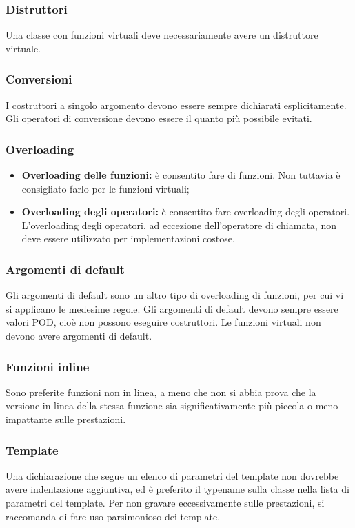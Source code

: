 \documentclass[../NomeDocumento.tex]{subfiles}
\begin{document}
	\subsubsection*{Distruttori}
	Una classe con funzioni virtuali deve necessariamente avere un distruttore virtuale.
		
	\subsubsection*{Conversioni} 
	I costruttori a singolo argomento devono essere sempre dichiarati esplicitamente.	Gli operatori di conversione devono essere il quanto più possibile evitati.
	
	\subsubsection*{Overloading}
	\begin{itemize}
		\item \textbf{Overloading delle funzioni:} è consentito fare  di funzioni. Non tuttavia è consigliato farlo per le funzioni virtuali;
		
		\item \textbf{Overloading degli operatori:} è consentito fare overloading degli operatori. L'overloading degli operatori, ad eccezione dell'operatore di chiamata, non deve essere utilizzato per implementazioni costose.
	\end{itemize}

	\subsubsection*{Argomenti di default} 
	Gli argomenti di default sono un altro tipo di overloading di funzioni, per cui vi si applicano le medesime regole. Gli argomenti di default devono sempre essere valori POD, cioè non possono eseguire costruttori. Le funzioni virtuali non devono avere argomenti di default.
		
	\subsubsection*{Funzioni inline}
	 Sono preferite funzioni non in linea, a meno che non si abbia prova che la versione in linea della stessa funzione sia significativamente più piccola o meno impattante sulle prestazioni.
	
	\subsubsection*{Template} 
	Una dichiarazione che segue un elenco di parametri del template non dovrebbe avere indentazione aggiuntiva, ed è preferito il typename sulla classe nella lista di parametri del template. Per non gravare eccessivamente sulle prestazioni, si raccomanda di fare uso parsimonioso dei template.
	
\end{document}
